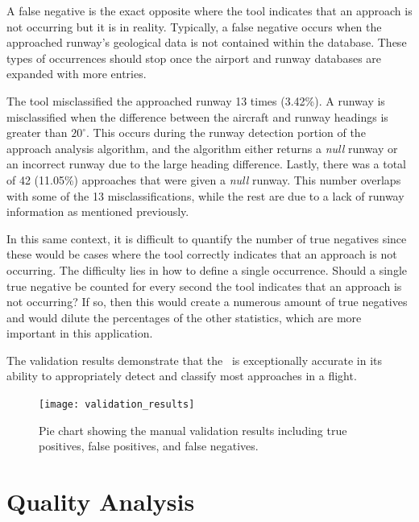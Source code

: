         A false negative is the exact opposite where the tool indicates that an approach is not occurring but it is in reality.  Typically, a false negative occurs when the approached runway's geological data is not contained within the database.  These types of occurrences should stop once the airport and runway databases are expanded with more entries.
        
        The tool misclassified the approached runway 13 times (3.42\%).  A runway is misclassified when the difference between the aircraft and runway headings is greater than $20^\circ$.  This occurs during the runway detection portion of the approach analysis algorithm, and the algorithm either returns a \emph{null} runway or an incorrect runway due to the large heading difference.  Lastly, there was a total of 42 (11.05\%) approaches that were given a \textit{null} runway.  This number overlaps with some of the 13 misclassifications, while the rest are due to a lack of runway information as mentioned previously.

        In this same context, it is difficult to quantify the number of true negatives since these would be cases where the tool correctly indicates that an approach is not occurring.  The difficulty lies in how to define a single occurrence.  Should a single true negative be counted for every second the tool indicates that an approach is not occurring?  If so, then this would create a numerous amount of true negatives and would dilute the percentages of the other statistics, which are more important in this application.

        The validation results demonstrate that the \toolname\ is exceptionally accurate in its ability to appropriately detect and classify most approaches in a flight.

        \begin{figure}
            \centering
            \texttt{[image: validation\_results]}
            \caption{Pie chart showing the manual validation results including true positives, false positives, and false negatives.}
            \label{fig:validation_results}
        \end{figure}
    
    
\section{Quality Analysis}


